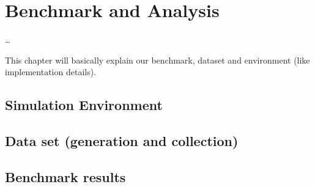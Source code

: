\chapter{Benchmark and Analysis}  \label{chap:bench_analysis}

\ifpdf
    \graphicspath{{7/figures/PNG/}{7/figures/PDF/}{7/figures/}}
\else
    \graphicspath{{7/figures/EPS/}{7/figures/}}
\fi

\dots


This chapter will basically explain our benchmark, dataset and environment (like implementation details).

\section{Simulation Environment}

\section{Data set (generation and collection)} \label{chap_b&a:sec:data_set}

\section{Benchmark results} \label{chap_b&a:sec:results}